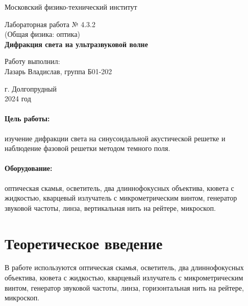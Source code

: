 \documentclass[14pt,a4paper]{article}
\begin{document}
\begin{titlepage}
	\begin{center}
		\large 	Московский физико-технический институт \\
		\vspace{0.2cm}

		\vspace{4.5cm}
		Лабораторная работа № 4.3.2 \\ \vspace{0.2cm}
		\large (Общая физика: оптика) \\ \vspace{0.2cm}
		\LARGE \textbf{Дифракция света на ультразвуковой волне}
	\end{center}
	\vspace{2.3cm} \large

	\begin{center}
		Работу выполнил: \\
        Лазарь Владислав, группа Б01-202




	\end{center}

	\begin{center} \vspace{110mm}
		г. Долгопрудный \\
		 2024 год
	\end{center}
\end{titlepage}


\newpage

\paragraph*{Цель работы:} изучение дифракции света на синусоидальной акустической решетке и наблюдение фазовой решетки методом темного поля.

	\paragraph*{Оборудование:} оптическая скамья, осветитель, два длиннофокусных объектива, кювета с жидкостью, кварцевый излучатель с микрометрическим винтом, генератор звуковой частоты, линза, вертикальная нить на рейтере, микроскоп.

	\section*{Теоретическое введение}

	В работе используются оптическая скамья, осветитель, два длиннофокусных объектива, кювета с жидкостью, кварцевый излучатель с микрометрическим винтом, генератор звуковой частоты, линза, горизонтальная нить на рейтере, микроскоп.
\end{document}
